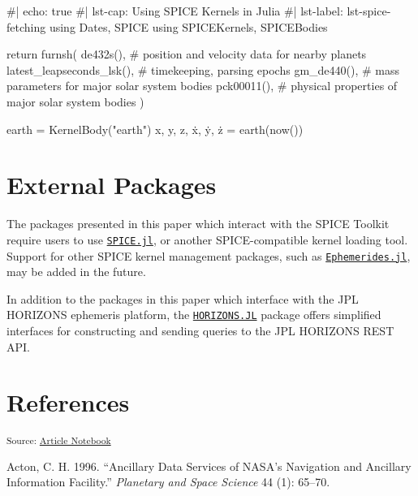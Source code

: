 \documentclass[
]{article}
\newenvironment{Shaded}{\begin{snugshade}}{\end{snugshade}}
\newcommand{\NormalTok}[1]{\textcolor[rgb]{0.00,0.23,0.31}{#1}}
\newlength{\cslhangindent}
\newenvironment{CSLReferences}[2] %
 {\begin{list}{}{%
  \setlength{\itemindent}{0pt}
  \setlength{\leftmargin}{0pt}
  \setlength{\parsep}{0pt}
  \ifodd #1
   \setlength{\leftmargin}{\cslhangindent}
   \setlength{\itemindent}{-1\cslhangindent}
  \fi
  \setlength{\itemsep}{#2\baselineskip}}}
 {\end{list}}
\begin{document}
\begin{Shaded}
\begin{Highlighting}[]
\NormalTok{\#| echo: true}
\NormalTok{\#| lst{-}cap: Using SPICE Kernels in Julia}
\NormalTok{\#| lst{-}label: lst{-}spice{-}fetching}
\NormalTok{using Dates, SPICE}
\NormalTok{using SPICEKernels, SPICEBodies}

\NormalTok{return furnsh(}
\NormalTok{    de432s(),                   \# position and velocity data for nearby planets}
\NormalTok{    latest\_leapseconds\_lsk(),   \# timekeeping, parsing epochs}
\NormalTok{    gm\_de440(),                 \# mass parameters for major solar system bodies}
\NormalTok{    pck00011(),                 \# physical properties of major solar system bodies}
\NormalTok{)}

\NormalTok{earth = KernelBody("earth")}
\NormalTok{x, y, z, ẋ, ẏ, ż = earth(now())}
\end{Highlighting}
\end{Shaded}

\section{External Packages}\label{external-packages}

The packages presented in this paper which interact with the SPICE
Toolkit require users to use
\href{https://github.com/JuliaAstro/SPICe.jl}{\texttt{SPICE.jl}}, or
another SPICE-compatible kernel loading tool. Support for other SPICE
kernel management packages, such as
\href{https://github.com/JuliaSpaceMissionDesign/Ephemerides.jl}{\texttt{Ephemerides.jl}},
may be added in the future.

In addition to the packages in this paper which interface with the JPL
HORIZONS ephemeris platform, the
\href{https://github.com/PerezHz/HORIZONS.jl}{\texttt{HORIZONS.JL}}
package offers simplified interfaces for constructing and sending
queries to the JPL HORIZONS REST API.

\section{References}\label{sec-ref}

\textsubscript{Source:
\href{https://cadojo.github.io/ephemeris.loopy.codes/index.qmd.html}{Article
Notebook}}

\label{refs}
\begin{CSLReferences}{1}{0}
Acton, C. H. 1996. {``{Ancillary Data Services of NASA's Navigation and
Ancillary Information Facility}.''} \emph{Planetary and Space Science}
44 (1): 65--70.

\end{CSLReferences}
\end{document}
